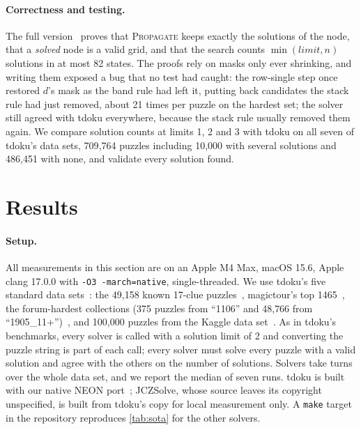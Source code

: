 \documentclass[11pt]{article}
\theoremstyle{definition}
\theoremstyle{plain}
\let\origtextsc\textsc
\renewcommand{\textsc}[1]{\textup{\origtextsc{#1}}}
\begin{document}
\paragraph{Correctness and testing.} The full version~\cite{kelly2026full} proves that \textsc{Propagate} keeps exactly
the solutions of the node, that a \emph{solved} node is a valid grid, and that the search counts $\min(\mathit{limit},
n)$ solutions in at most 82 states. The proofs rely on masks only ever shrinking, and writing them exposed a bug that no
test had caught: the row-single step once restored $d$'s mask as the band rule had left it, putting back candidates the
stack rule had just removed, about 21 times per puzzle on the hardest set; the solver still agreed with tdoku
everywhere, because the stack rule usually removed them again. We compare solution counts at limits 1, 2 and 3 with
tdoku on all seven of tdoku's data sets, 709{,}764 puzzles including 10{,}000 with several solutions and 486{,}451 with
none, and validate every solution found.

\section{Results}
\label{sec:results}

\paragraph{Setup.} All measurements in this section are on an Apple M4 Max, macOS 15.6, Apple clang 17.0.0 with
\texttt{-O3 -march=native}, single-threaded. We use tdoku's five standard data sets~\cite{dillon2019nerdsniped}: the
49{,}158 known 17-clue puzzles~\cite{royle17clue,champagne2022all17}, magictour's top
1465~\cite{stertenbrink2005top1465}, the forum-hardest collections (375 puzzles from ``1106'' and 48{,}766 from
``1905\_11+'')~\cite{forumhardest}, and 100{,}000 puzzles from the Kaggle data set~\cite{park2016kaggle}. As in tdoku's
benchmarks, every solver is called with a solution limit of 2 and converting the puzzle string is part of each call;
every solver must solve every puzzle with a valid solution and agree with the others on the number of solutions.
Solvers take turns over the whole data set, and we report the median of seven runs. tdoku is built with our native
NEON port~\cite{kelly2026tdokuarm}; JCZSolve, whose source leaves its copyright unspecified, is built from tdoku's copy
for local measurement only. A \texttt{make} target in the repository reproduces \cref{tab:sota} for the other solvers.
\end{document}

